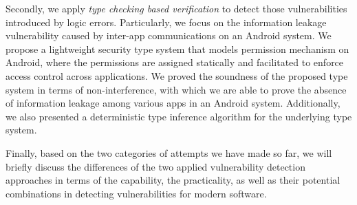 Secondly, we apply \emph{type checking based verification} to detect those vulnerabilities introduced by logic errors. Particularly, we focus on the information leakage vulnerability caused by inter-app communications on an Android system. 
We propose a lightweight security type system that models permission mechanism on Android, where the permissions are assigned statically and facilitated to enforce access control across applications. 
We proved the soundness of the proposed type system in terms of non-interference, with which we are able to prove the absence of information leakage among various apps in an Android system.
 Additionally, we also presented a deterministic type inference algorithm for the underlying type system. 

Finally, based on the two categories of attempts we have made so far, we will briefly discuss the differences of the two applied vulnerability detection approaches in terms of the capability, the practicality, as well as their potential combinations in detecting vulnerabilities for modern software.


